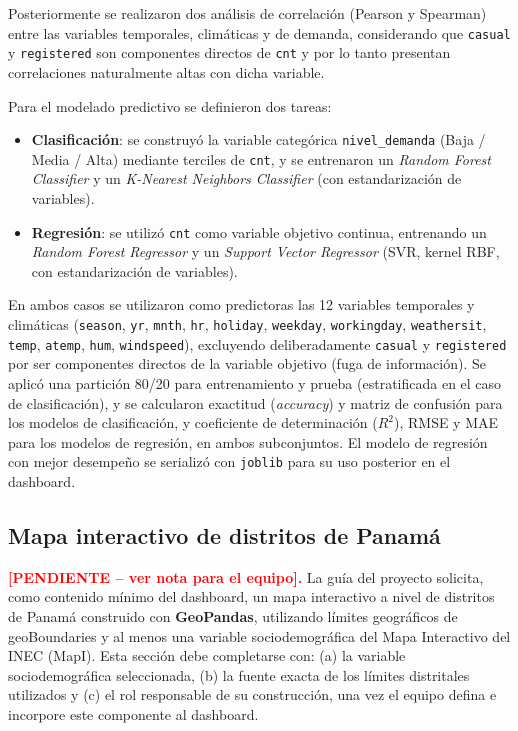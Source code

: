 \documentclass[conference]{IEEEtran}
\begin{document}
Posteriormente se realizaron dos análisis de correlación (Pearson y Spearman) entre las variables temporales, climáticas y de demanda, considerando que \texttt{casual} y \texttt{registered} son componentes directos de \texttt{cnt} y por lo tanto presentan correlaciones naturalmente altas con dicha variable.

Para el modelado predictivo se definieron dos tareas:

\begin{itemize}
\item \textbf{Clasificación}: se construyó la variable categórica \texttt{nivel\_demanda} (Baja / Media / Alta) mediante terciles de \texttt{cnt}, y se entrenaron un \textit{Random Forest Classifier} y un \textit{K-Nearest Neighbors Classifier} (con estandarización de variables).
\item \textbf{Regresión}: se utilizó \texttt{cnt} como variable objetivo continua, entrenando un \textit{Random Forest Regressor} y un \textit{Support Vector Regressor} (SVR, kernel RBF, con estandarización de variables).
\end{itemize}

En ambos casos se utilizaron como predictoras las 12 variables temporales y climáticas (\texttt{season}, \texttt{yr}, \texttt{mnth}, \texttt{hr}, \texttt{holiday}, \texttt{weekday}, \texttt{workingday}, \texttt{weathersit}, \texttt{temp}, \texttt{atemp}, \texttt{hum}, \texttt{windspeed}), excluyendo deliberadamente \texttt{casual} y \texttt{registered} por ser componentes directos de la variable objetivo (fuga de información). Se aplicó una partición 80/20 para entrenamiento y prueba (estratificada en el caso de clasificación), y se calcularon exactitud (\textit{accuracy}) y matriz de confusión para los modelos de clasificación, y coeficiente de determinación ($R^2$), RMSE y MAE para los modelos de regresión, en ambos subconjuntos. El modelo de regresión con mejor desempeño se serializó con \texttt{joblib} para su uso posterior en el dashboard.

\subsection{Mapa interactivo de distritos de Panamá}

\textcolor{red}{\textbf{[PENDIENTE -- ver nota para el equipo].}} La guía del proyecto solicita, como contenido mínimo del dashboard, un mapa interactivo a nivel de distritos de Panamá construido con \textbf{GeoPandas}, utilizando límites geográficos de geoBoundaries y al menos una variable sociodemográfica del Mapa Interactivo del INEC (MapI). Esta sección debe completarse con: (a) la variable sociodemográfica seleccionada, (b) la fuente exacta de los límites distritales utilizados y (c) el rol responsable de su construcción, una vez el equipo defina e incorpore este componente al dashboard.
\end{document}
